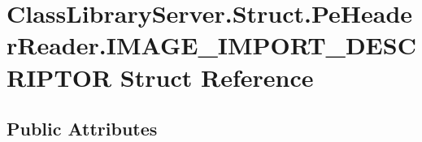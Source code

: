 \hypertarget{struct_class_library_server_1_1_struct_1_1_pe_header_reader_1_1_i_m_a_g_e___i_m_p_o_r_t___d_e_s_c_r_i_p_t_o_r}{}\section{Class\+Library\+Server.\+Struct.\+Pe\+Header\+Reader.\+I\+M\+A\+G\+E\+\_\+\+I\+M\+P\+O\+R\+T\+\_\+\+D\+E\+S\+C\+R\+I\+P\+T\+OR Struct Reference}
\label{struct_class_library_server_1_1_struct_1_1_pe_header_reader_1_1_i_m_a_g_e___i_m_p_o_r_t___d_e_s_c_r_i_p_t_o_r}
\subsection*{Public Attributes}
